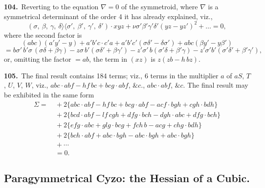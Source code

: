 \documentclass[11pt,a4paper]{article}
\newcommand{\bw}{\mathrel{\rangle\!\langle}}
\begin{document}
\medskip

\textbf{104.}\ Reverting to the equation $\nabla = 0$ of the symmetroid, where $\nabla$ is a symmetrical determinant of the order 4 it has already explained, viz.,
\[
(\sigma,\ \beta,\ \gamma,\ \delta\bw\sigma',\ \beta',\ \gamma',\ \delta') \cdot xyz + \nu\sigma'\beta'\gamma'\delta'(yz - yz')^2 + \dots = 0,
\]
where the second factor is
\[
(abc)(a'y' - y) + a'b'c\cdot c'a + a'b'c'(\sigma\delta' - \delta\sigma') + abc(\beta y' - y\beta')
\]
\[
= b\sigma'\,b'\sigma\,(\sigma\delta + \beta\gamma) - z\sigma\,b'(\sigma\delta' + \beta\gamma') - z'\sigma'\,b(\sigma'\delta + \beta'\gamma) - z'\sigma'b'(\sigma'\delta' + \beta'\gamma'),
\]
or, omitting the factor $= ab$, the term in $(xz)$ is $z(zb - h\,bz)$.

\medskip

\textbf{105.}\ The final result contains 184 terms; viz., 6 terms in the multiplier $a$ of $aS$, $T$, $U$, $V$, $W$, viz., $abc \cdot abf - hf\,bc + bcg \cdot abf$, $\&c.$, $abc \cdot abf$, $\&c.$ The final result may be exhibited in the same form
\begin{align*}
\Sigma = &\ + 2\big\{abc\cdot abf - hf\,bc + bcg \cdot abf - acf \cdot bgh + cgh \cdot bdh\big\}\\
&\ + 2\big\{bcd\cdot abf - lf\,cgh + dfg \cdot bch - dgh \cdot abc + dfg \cdot bch\big\}\\
&\ + 2\big\{efg\cdot abc + glg \cdot bcg + fch\,b - acg + chg \cdot bdh\big\}\\
&\ + 2\big\{bch \cdot abf + abc \cdot bgh - abc \cdot bgh + abc \cdot bgh\big\}\\
&\ + \cdots\\
&\ = 0.
\end{align*}

\newpage
\setcounter{page}{175}

\subsection*{Paragymmetrical Cyzo: the Hessian of a Cubic.}
\end{document}

